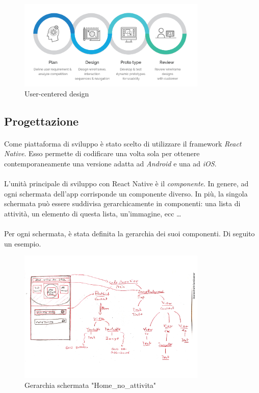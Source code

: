 \documentclass[11pt,a4paper,english]{article}
\begin{document}
\begin{figure}[H]
    \centering
    \includegraphics[width=0.8\textwidth]{img/user-centered-design.png}
    \caption{User-centered design}
\end{figure}

\subsection{Progettazione}

\paragraph{} Come piattaforma di sviluppo è stato scelto di utilizzare il framework \emph{React Native}. Esso permette di codificare una volta sola per ottenere contemporaneamente una versione adatta ad \emph{Android} e una ad \emph{iOS}. 

\paragraph{} L'unità principale di sviluppo con React Native è il \emph{componente}. In genere, ad ogni schermata dell'app corrisponde un componente diverso. In più, la singola schermata può essere suddivisa gerarchicamente in componenti: una lista di attività, un elemento di questa lista, un'immagine, ecc \dots

\paragraph{} Per ogni schermata, è stata definita la gerarchia dei suoi componenti. Di seguito un esempio. 

\begin{figure}[H]
    \centering
    \includegraphics[width=0.8\textwidth]{img/componenti home.pdf}
    \caption{Gerarchia schermata "Home\_no\_attivita"}
\end{figure}
\end{document}
